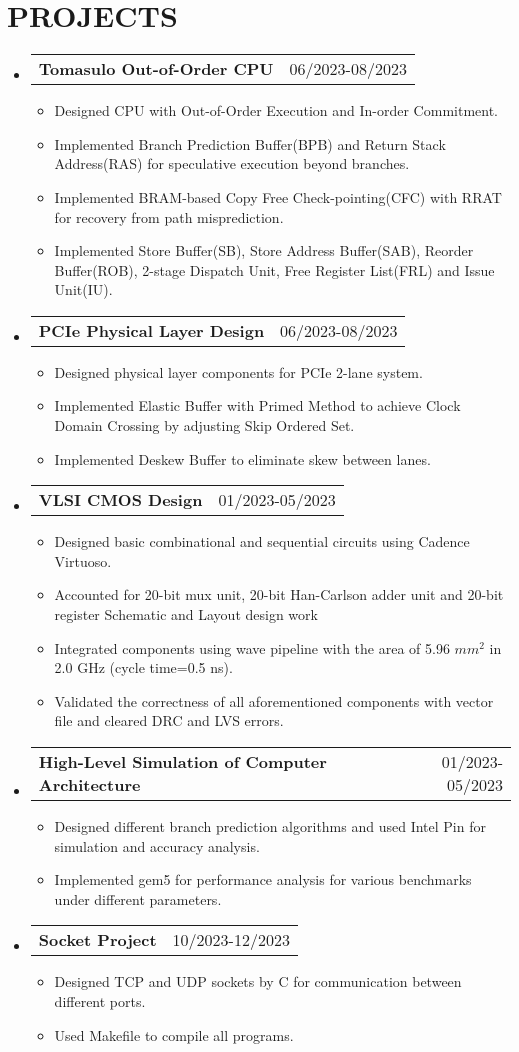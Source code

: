 \documentclass[letterpaper,11pt]{article}
\makeatletter
\newcommand{\resumeItemOne}[1]{
  \item\small{#1}
}
\newcommand{\resumeSubheadingNoTitle}[2]{
  \vspace{-1pt}\item
    \begin{tabular*}{0.97\textwidth}[t]{l@{\extracolsep{\fill}}r}
      \textbf{#1} & #2 %
    \end{tabular*}\vspace{-5pt}
}
\newcommand{\resumeSubHeadingListStart}{\begin{itemize}[leftmargin=*]}
\newcommand{\resumeSubHeadingListEnd}{\end{itemize}\vspace{-5pt}}
\newcommand{\resumeItemListStart}{\begin{itemize}}
\newcommand{\resumeItemListEnd}{\end{itemize}\vspace{-10pt}}
\makeatother
\begin{document}
\section{PROJECTS}
\resumeSubHeadingListStart
\resumeSubheadingNoTitle
    {Tomasulo Out-of-Order CPU}{06/2023-08/2023}
\resumeItemListStart
	\resumeItemOne{Designed CPU with Out-of-Order Execution and In-order Commitment.}
	\resumeItemOne{Implemented Branch Prediction Buffer(BPB) and Return Stack Address(RAS) for speculative execution beyond branches.}
	\resumeItemOne{Implemented BRAM-based Copy Free Check-pointing(CFC) with RRAT for recovery from path misprediction.}
	\resumeItemOne{Implemented Store Buffer(SB), Store Address Buffer(SAB), Reorder Buffer(ROB), 2-stage Dispatch Unit, Free Register List(FRL) and Issue Unit(IU).}
\resumeItemListEnd
\resumeSubheadingNoTitle
    {PCIe Physical Layer Design}{06/2023-08/2023}
\resumeItemListStart
	\resumeItemOne{Designed physical layer components for PCIe 2-lane system.}
	\resumeItemOne{Implemented Elastic Buffer with Primed Method to achieve Clock Domain Crossing by adjusting Skip Ordered Set.}
	\resumeItemOne{Implemented Deskew Buffer to eliminate skew between lanes.}
\resumeItemListEnd
\resumeSubheadingNoTitle
    {VLSI CMOS Design}{01/2023-05/2023}
\resumeItemListStart
	\resumeItemOne{Designed basic combinational and sequential circuits using Cadence Virtuoso.}
	\resumeItemOne{Accounted for 20-bit mux unit, 20-bit Han-Carlson adder unit and 20-bit register Schematic and Layout design work}
	\resumeItemOne{Integrated components using wave pipeline with the area of 5.96 $mm^2$ in 2.0 GHz (cycle time=0.5 ns).}
	\resumeItemOne{Validated the correctness of all aforementioned components with vector file and cleared DRC and LVS errors.}
\resumeItemListEnd
\resumeSubheadingNoTitle
    {High-Level Simulation of Computer Architecture}{01/2023-05/2023}
\resumeItemListStart
	\resumeItemOne{Designed different branch prediction algorithms and used Intel Pin for simulation and accuracy analysis.}
	\resumeItemOne{Implemented gem5 for performance analysis for various benchmarks under different parameters.}
\resumeItemListEnd
\resumeSubheadingNoTitle
    {Socket Project}{10/2023-12/2023}
\resumeItemListStart
	\resumeItemOne{Designed TCP and UDP sockets by C for communication between different ports.}
	\resumeItemOne{Used Makefile to compile all programs.}
\resumeItemListEnd
\resumeSubHeadingListEnd
\end{document}
